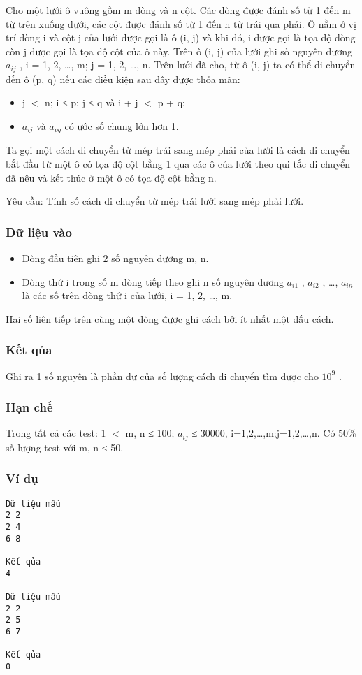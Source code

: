 



   Cho một lưới ô vuông gồm m dòng và n cột. Các dòng được đánh số từ 1 đến m từ trên xuống dưới, các cột được đánh số từ 1 đến n từ trái qua phải. Ô nằm ở vị trí dòng i và cột j của lưới được gọi là ô   (i, j) và khi đó, i được gọi là tọa độ dòng còn j được gọi là tọa độ cột của ô này. Trên ô (i, j) của lưới ghi số nguyên dương $a_{ij}$   , i = 1, 2, …, m; j = 1, 2, …, n. Trên lưới đã cho, từ ô (i, j) ta có thể   di chuyển đến ô (p, q) nếu các điều kiện sau đây được thỏa mãn:  
\begin{itemize}
	\item     j $<$ n; i ≤ p; j ≤ q và i + j $<$ p + q;   
	\item     $a_{ij}$    và $a_{pq}$    có ước số chung lớn hơn 1.   
\end{itemize}

   Ta gọi một cách di chuyển từ mép trái sang mép phải của lưới là cách di chuyển bắt đầu từ một ô có tọa độ cột bằng 1 qua các ô của lưới theo qui tắc di chuyển đã nêu và kết thúc ở một ô có tọa độ cột   bằng n.  

   Yêu cầu: Tính số cách di chuyển từ mép trái lưới sang mép phải lưới.  

\subsubsection{   Dữ liệu vào  }
\begin{itemize}
	\item     Dòng đầu tiên ghi 2 số nguyên dương m, n.   
	\item     Dòng thứ i trong số m dòng tiếp theo ghi n số nguyên dương $a_{i1}$    , $a_{i2}$    , …, $a_{in}$    là các số trên dòng thứ i của lưới, i = 1, 2, …, m.   
\end{itemize}

   Hai số liên tiếp trên cùng một dòng được ghi cách bởi ít nhất một dấu cách.  

\subsubsection{   Kết qủa  }

   Ghi ra 1 số nguyên là phần dư của số lượng cách di chuyển tìm được cho $10^{9}$   .  

\subsubsection{   Hạn chế  }

   Trong tất cả các test: 1 $<$ m, n ≤ 100; $a_{ij}$   ≤ 30000, i=1,2,…,m;j=1,2,…,n. Có 50\% số lượng test với m, n ≤ 50.  

\subsubsection{   Ví dụ  }
\begin{verbatim}
Dữ liệu mẫu
2 2
2 4
6 8

Kết qủa
4

Dữ liệu mẫu
2 2
2 5
6 7

Kết qủa
0
\end{verbatim}
